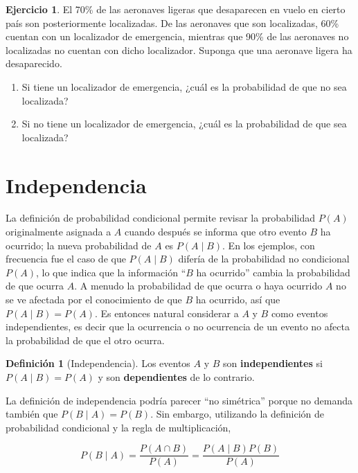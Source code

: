 \documentclass[
  11pt,
]{book}
\providecommand{\tightlist}{%
  \setlength{\itemsep}{0pt}\setlength{\parskip}{0pt}}
\theoremstyle{definition}
\newtheorem{definition}{Definición}[chapter]
\theoremstyle{definition}
\theoremstyle{definition}
\newtheorem{exercise}{Ejercicio}[chapter]
\theoremstyle{definition}
\theoremstyle{remark}
\begin{document}
\begin{exercise}
\leavevmode

El 70\% de las aeronaves ligeras que desaparecen en vuelo en cierto país son posteriormente localizadas. De las aeronaves que son localizadas, 60\% cuentan con un localizador de emergencia, mientras que 90\% de las aeronaves no localizadas no cuentan con dicho localizador. Suponga que una aeronave ligera ha desaparecido.

\begin{enumerate}
\def\labelenumi{\arabic{enumi}.}
\tightlist
\item
  Si tiene un localizador de emergencia, ¿cuál es la probabilidad de que no sea localizada?
\item
  Si no tiene un localizador de emergencia, ¿cuál es la probabilidad de que sea localizada?
\end{enumerate}

\end{exercise}

\section{Independencia}\label{probabilidad-independencia}

La definición de probabilidad condicional permite revisar la probabilidad \(P(A)\) originalmente asignada a \(A\) cuando después se informa que otro evento \(B\) ha ocurrido; la nueva probabilidad de \(A\) es \(P(A \mid B)\). En los ejemplos, con frecuencia fue el caso de que \(P(A \mid B)\) difería de la probabilidad no condicional \(P(A)\), lo que indica que la información ``\(B\) ha ocurrido'' cambia la probabilidad de que ocurra \(A\). A menudo la probabilidad de que ocurra o haya ocurrido \(A\) no se ve afectada por el conocimiento de que \(B\) ha ocurrido, así que \(P(A \mid B) = P(A)\). Es entonces natural considerar a \(A\) y \(B\) como eventos independientes, es decir que la ocurrencia o no ocurrencia de un evento no afecta la probabilidad de que el otro ocurra. \citep[página 76]{Devore}

\begin{definition}[Independencia]

Los eventos \(A\) y \(B\) son \textbf{independientes} si \(P(A \mid B) = P(A)\) y son \textbf{dependientes} de lo contrario.

La definición de independencia podría parecer ``no simétrica'' porque no demanda también que \(P(B \mid A) = P(B)\). Sin embargo, utilizando la definición de probabilidad condicional y la regla de multiplicación,

\begin{equation}
P(B \mid A) = \frac{P(A \cap B)}{P(A)} = \frac{P(A \mid B)P(B)}{P(A)}
\label{eq:regla-probabilidad-independencia}
\end{equation}

\end{definition}
\end{document}
